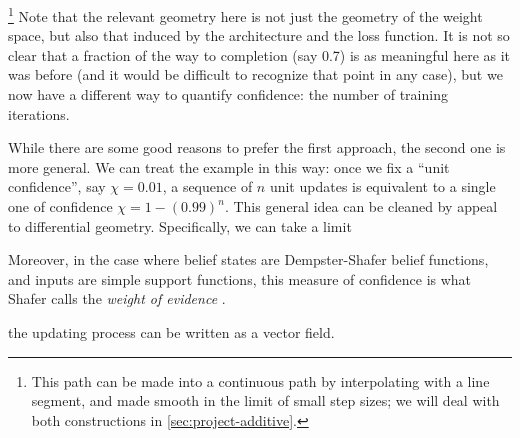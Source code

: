 	\footnote{This path can be made into a continuous path by interpolating with a line segment, and made smooth in the limit of small step sizes; we will deal with both constructions in \cref{sec:project-additive}.}
Note that the relevant geometry here is not just the geometry of the weight space, but also that induced by the architecture and the loss function.
It is not so clear that a fraction of the way to completion (say 0.7) is as meaningful here as it was before (and it would be difficult to recognize that point in any case),
but we now have a different way to quantify confidence: the number of training iterations. 

While there are some good reasons to prefer the first approach, 
the second one is more general. 
We can treat the example in this way: once we fix a ``unit confidence'', say $\chi=0.01$, a sequence of $n$ unit updates is equivalent to a single one of confidence $\chi= 1-(0.99)^n$. 
This general idea can be cleaned by appeal to differential geometry.
Specifically, we can take a limit

Moreover, in the case where belief states are Dempster-Shafer belief functions, 
and inputs are simple support functions, this measure of confidence is what Shafer calls the \emph{weight of evidence} \parencite{shafer1976mathematical}.

the updating process can be written as a vector field.









